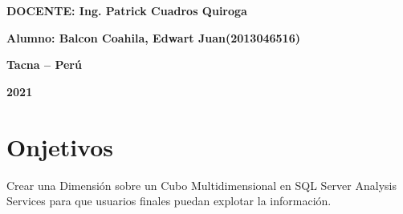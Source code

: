 \documentclass{article}
\begin{document}
\begin{titlepage}
\begin{center}
\vspace*{0.3in}
\begin{Large}
\textbf{DOCENTE: Ing. Patrick Cuadros Quiroga} \\
\end{Large}

\vspace*{0.2in}
\vspace*{0.1in}
\begin{large}

\begin{Large}
\textbf{Alumno: Balcon Coahila, Edwart Juan\hfill	(2013046516) } \\
\end{Large}

\vspace*{0.15in}
\begin{Large}
\textbf{Tacna – Perú} \\
\end{Large}

\vspace*{0.05in}
\begin{Large}
\textbf{2021 } \\
\end{Large}

\end{large}
\end{center}

\end{titlepage}

\section{Onjetivos}
Crear una Dimensión sobre un Cubo Multidimensional en SQL Server Analysis Services para que usuarios
finales puedan explotar la información.

\end{document}
